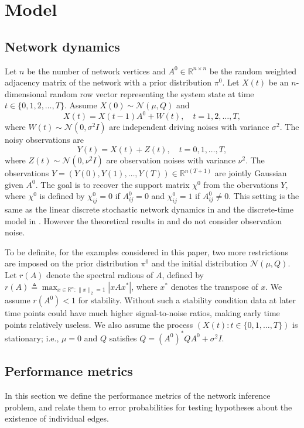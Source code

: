 \documentclass[conference,letterpaper]{IEEEtran}
\newcommand{\defeq}{\triangleq}
\newcommand{\reals}{\mathbb{R}}%
\newcommand{\ind}[2]{\left(#1\colon #2\right)} %
\newcommand{\T}{^{*}}%
\newcommand{\trueAdjMat}{A^0}%
\newcommand{\specRad}{r}%
\newcommand{\sigmat}{\nu}%
\newcommand{\sigmab}{\sigma}%
\newcommand{\meanInit}{\mu}%
\newcommand{\covInit}{Q}%
\newcommand{\trueSuppMat}{\chi^0}%
\begin{document}
\section{Model}
\label{sec:model}
\subsection{Network dynamics}
Let $n$ be the number of network vertices and
$\trueAdjMat\in\reals^{n\times n}$ be the random weighted adjacency
matrix of the network with a prior distribution $\pi^0$.  Let $X(t)$
be an $n$-dimensional random row vector representing the system state
at time $t\in\{0, 1, 2, \dots, T\}$.  Assume
$X(0) \sim \mathcal N(\meanInit, \covInit)$ and
\[X(t) = X(t - 1)\trueAdjMat+W(t),\quad t = 1, 2, \dots, T,\]
where $W(t)\sim\mathcal N(0, \sigmab^2I)$ are independent driving
noises with variance $\sigmab^2$.  The noisy observations are
\[Y(t) = X(t)+Z(t),\quad t = 0, 1, \dots, T,\]
where $Z(t)\sim\mathcal N(0, \sigmat^2I)$ are observation noises with
variance $\sigmat^2$.  The observations
$Y = (Y(0), Y(1), \dots, Y(T))\in\reals^{n(T+1)}$ are jointly Gaussian
given $\trueAdjMat$.  The goal is to recover the support matrix
$\trueSuppMat$ from the obervations $Y$, where $\trueSuppMat$ is
defined by $\trueSuppMat_{ij} = 0$ if $\trueAdjMat_{ij} = 0$ and
$\trueSuppMat_{ij} = 1$ if $\trueAdjMat_{ij}\neq 0$.  This setting is
the same as the linear discrete stochastic network dynamics in
\cite{SunTaylorBollt15} and the discrete-time model in
\cite{BentoIbrahimiMontanari10}.  However the theoretical results in
\cite{SunTaylorBollt15} and \cite{BentoIbrahimiMontanari10} do not
consider observation noise.

To be definite, for the examples considered in this paper, two more
restrictions are imposed on the prior distribution $\pi^0$ and the
initial distribution $\mathcal N(\meanInit, \covInit)$.  Let
$\specRad(A)$ denote the spectral radious of $A$, defined by
$\specRad(A) \defeq\max_{x\in\reals^n\colon\|x\|_2 = 1}|xAx\T|$, where
$x\T$ denotes the transpose of $x$.  We assume
$\specRad(\trueAdjMat) < 1$ for stability.  Without such a stability
condition data at later time points could have much higher
signal-to-noise ratios, making early time points relatively useless.
We also assume the process $\ind{X(t)}{t\in\{0, 1, \dots, T\}}$ is
stationary; i.e., $\meanInit = 0$ and $\covInit$ satisfies
$\covInit = (\trueAdjMat)\T\covInit\trueAdjMat + \sigmab^2I$.
\subsection{Performance metrics}
In this section we define the performance metrics of the network
inference problem, and relate them to error probabilities for
testing hypotheses about the existence of individual edges.
\end{document}
